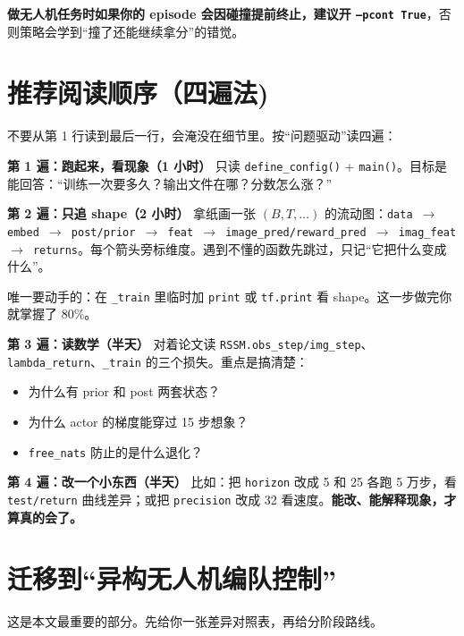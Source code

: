 \documentclass[11pt]{ctexart}
\begin{document}
\textbf{做无人机任务时如果你的 episode 会因碰撞提前终止，建议开 \texttt{--pcont True}}，否则策略会学到``撞了还能继续拿分''的错觉。

\section{推荐阅读顺序（四遍法)}
不要从第 1 行读到最后一行，会淹没在细节里。按``问题驱动''读四遍：

\textbf{第 1 遍：跑起来，看现象（1 小时）}
只读 \texttt{define\_config()} + \texttt{main()}。目标是能回答：``训练一次要多久？输出文件在哪？分数怎么涨？''

\textbf{第 2 遍：只追 shape（2 小时）}
拿纸画一张 $(B,T,\dots)$ 的流动图：\texttt{data $\rightarrow$ embed $\rightarrow$ post/prior $\rightarrow$ feat $\rightarrow$ image\_pred/reward\_pred $\rightarrow$ imag\_feat $\rightarrow$ returns}。每个箭头旁标维度。遇到不懂的函数先跳过，只记``它把什么变成什么''。

唯一要动手的：在 \texttt{\_train} 里临时加 \texttt{print} 或 \texttt{tf.print} 看 shape。这一步做完你就掌握了 80\%。

\textbf{第 3 遍：读数学（半天）}
对着论文读 \texttt{RSSM.obs\_step/img\_step}、\texttt{lambda\_return}、\texttt{\_train} 的三个损失。重点是搞清楚：
\begin{itemize}
  \item 为什么有 prior 和 post 两套状态？
  \item 为什么 actor 的梯度能穿过 15 步想象？
  \item \texttt{free\_nats} 防止的是什么退化？
\end{itemize}

\textbf{第 4 遍：改一个小东西（半天）}
比如：把 \texttt{horizon} 改成 5 和 25 各跑 5 万步，看 \texttt{test/return} 曲线差异；或把 \texttt{precision} 改成 32 看速度。\textbf{能改、能解释现象，才算真的会了。}

\section{迁移到``异构无人机编队控制''}
这是本文最重要的部分。先给你一张差异对照表，再给分阶段路线。
\end{document}
